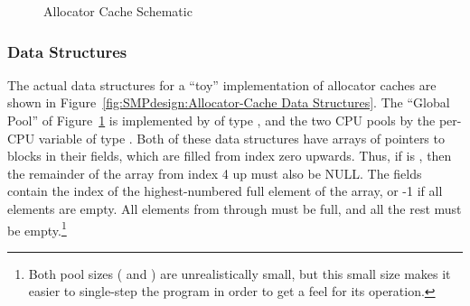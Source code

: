 \begin{figure}[htb]
\begin{center}
\end{center}
\caption{Allocator Cache Schematic}
\label{fig:SMPdesign:Allocator Cache Schematic}
\end{figure}

\subsubsection{Data Structures}

The actual data structures for a ``toy'' implementation of allocator
caches are shown in
Figure~\ref{fig:SMPdesign:Allocator-Cache Data Structures}.
The ``Global Pool'' of Figure~\ref{fig:SMPdesign:Allocator Cache Schematic}
is implemented by  of type ,
and the two CPU pools by the per-CPU variable  of
type .
Both of these data structures have arrays of pointers to blocks
in their  fields, which are filled from index zero upwards.
Thus, if  is , then the remainder of
the array from index 4 up must also be NULL.
The  fields contain the index of the highest-numbered full
element of the  array, or -1 if all elements are empty.
All elements from  through
 must be full, and all the rest
must be empty.\footnote{
	Both pool sizes ( and
	) are unrealistically small, but this small
	size makes it easier to single-step the program in order to get
	a feel for its operation.}

